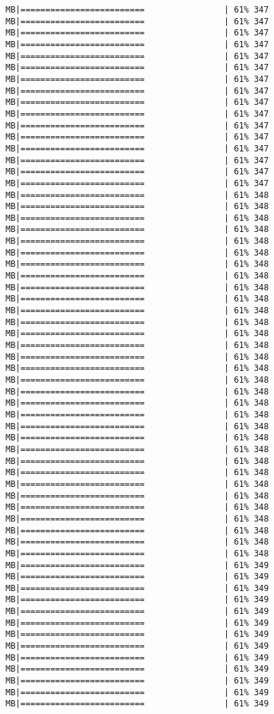 \documentclass[
]{article}
\begin{document}
\begin{verbatim}
MB|=========================                | 61% 347 MB|=========================                | 61% 347 MB|=========================                | 61% 347 MB|=========================                | 61% 347 MB|=========================                | 61% 347 MB|=========================                | 61% 347 MB|=========================                | 61% 347 MB|=========================                | 61% 347 MB|=========================                | 61% 347 MB|=========================                | 61% 347 MB|=========================                | 61% 347 MB|=========================                | 61% 347 MB|=========================                | 61% 347 MB|=========================                | 61% 347 MB|=========================                | 61% 347 MB|=========================                | 61% 347 MB|=========================                | 61% 348 MB|=========================                | 61% 348 MB|=========================                | 61% 348 MB|=========================                | 61% 348 MB|=========================                | 61% 348 MB|=========================                | 61% 348 MB|=========================                | 61% 348 MB|=========================                | 61% 348 MB|=========================                | 61% 348 MB|=========================                | 61% 348 MB|=========================                | 61% 348 MB|=========================                | 61% 348 MB|=========================                | 61% 348 MB|=========================                | 61% 348 MB|=========================                | 61% 348 MB|=========================                | 61% 348 MB|=========================                | 61% 348 MB|=========================                | 61% 348 MB|=========================                | 61% 348 MB|=========================                | 61% 348 MB|=========================                | 61% 348 MB|=========================                | 61% 348 MB|=========================                | 61% 348 MB|=========================                | 61% 348 MB|=========================                | 61% 348 MB|=========================                | 61% 348 MB|=========================                | 61% 348 MB|=========================                | 61% 348 MB|=========================                | 61% 348 MB|=========================                | 61% 348 MB|=========================                | 61% 348 MB|=========================                | 61% 348 MB|=========================                | 61% 349 MB|=========================                | 61% 349 MB|=========================                | 61% 349 MB|=========================                | 61% 349 MB|=========================                | 61% 349 MB|=========================                | 61% 349 MB|=========================                | 61% 349 MB|=========================                | 61% 349 MB|=========================                | 61% 349 MB|=========================                | 61% 349 MB|=========================                | 61% 349 MB|=========================                | 61% 349 MB|=========================                | 61% 349 
\end{verbatim}
\end{document}
